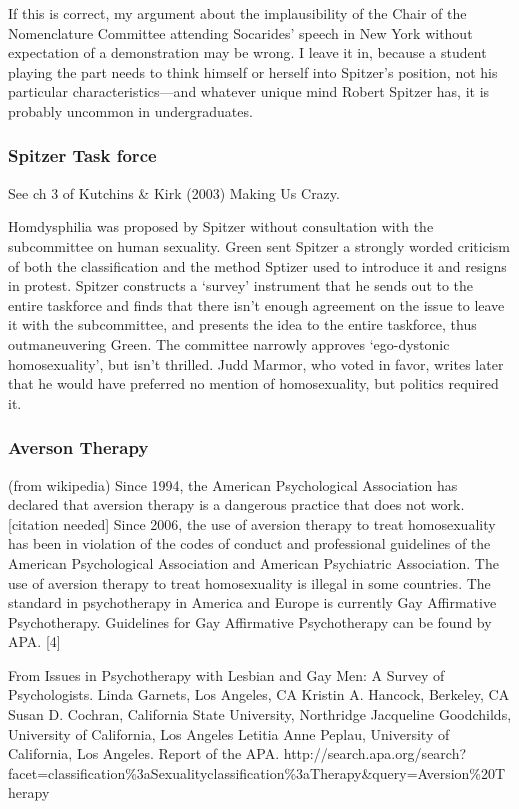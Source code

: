 If this is correct, my argument about the implausibility of the Chair of the Nomenclature Committee attending Socarides' speech in New York without expectation of a demonstration may be wrong. I leave it in, because a student playing the part needs to think himself or herself into Spitzer's position, not his particular characteristics—and whatever unique mind Robert Spitzer has, it is probably uncommon in undergraduates.

\subsubsection{Spitzer Task force}
\label{spitzertaskforce}

See ch 3 of Kutchins \& Kirk (2003) Making Us Crazy. 

Homdysphilia was proposed by Spitzer without consultation with the subcommittee on human sexuality. Green sent Spitzer a strongly worded criticism of both the classification and the method Sptizer used to introduce it and resigns in protest. Spitzer constructs a `survey' instrument that he sends out to the entire taskforce and finds that there isn't enough agreement on the issue to leave it with the subcommittee, and presents the idea to the entire taskforce, thus outmaneuvering Green. The committee narrowly approves `ego-dystonic homosexuality', but isn't thrilled. Judd Marmor, who voted in favor, writes later that he would have preferred no mention of homosexuality, but politics required it.

\subsubsection{Averson Therapy}
\label{aversontherapy}

(from wikipedia) Since 1994, the American Psychological Association has declared that aversion therapy is a dangerous practice that does not work.[citation needed] Since 2006, the use of aversion therapy to treat homosexuality has been in violation of the codes of conduct and professional guidelines of the American Psychological Association and American Psychiatric Association. The use of aversion therapy to treat homosexuality is illegal in some countries. The standard in psychotherapy in America and Europe is currently Gay Affirmative Psychotherapy. Guidelines for Gay Affirmative Psychotherapy can be found by APA. [4]

From Issues in Psychotherapy with Lesbian and Gay Men: A Survey of Psychologists. Linda Garnets, Los Angeles, CA Kristin A. Hancock, Berkeley, CA Susan D. Cochran, California State University, Northridge Jacqueline Goodchilds, University of California, Los Angeles Letitia Anne Peplau, University of California, Los Angeles. Report of the APA. http:\slash \slash search.apa.org\slash search?facet=classification\%3aSexuality\textbar{}\textbar{}classification\%3aTherapy\&query=Aversion\%20Therapy

